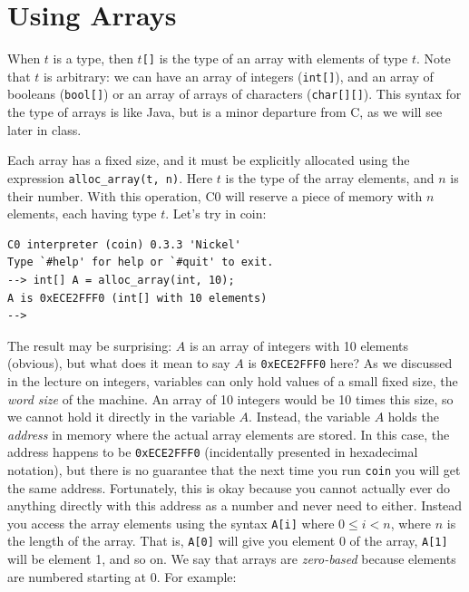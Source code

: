 \section{Using Arrays}
\label{sec:arrays:using}

When $t$ is a type, then $t$\lstinline'[]' is the type of an array
with elements of type $t$.  Note that $t$ is arbitrary: we can have an
array of integers (\lstinline'int[]'), and an array of booleans
(\lstinline'bool[]') or an array of arrays of characters
(\lstinline'char[][]').  This syntax for the type of arrays is like
Java, but is a minor departure from C, as we will see later in class.

Each array has a fixed size, and it must be explicitly allocated using
the expression \lstinline'alloc_array(t, n)'.  Here $t$ is the type of
the array elements, and $n$ is their number.  With this operation, C0
will reserve a piece of memory with $n$ elements, each having type
$t$.  Let's try in coin:

\begin{lstlisting}[language={[coin]C}]
% coin
C0 interpreter (coin) 0.3.3 'Nickel'
Type `#help' for help or `#quit' to exit.
--> int[] A = alloc_array(int, 10);
A is 0xECE2FFF0 (int[] with 10 elements)
-->
\end{lstlisting}

The result may be surprising: $A$ is an array of integers with 10
elements (obvious), but what does it mean to say $A$ is
\lstinline'0xECE2FFF0' here?  As we discussed in the lecture on
integers, variables can only hold values of a small fixed size, the
\emph{word size} of the machine.  An array of 10 integers would be 10
times this size, so we cannot hold it directly in the variable $A$.
Instead, the variable $A$ holds the \emph{address} in memory where the
actual array elements are stored.  In this case, the address happens
to be \lstinline'0xECE2FFF0' (incidentally presented in hexadecimal
notation), but there is no guarantee that the next time you run
\lstinline'coin' you will get the same address.  Fortunately, this is
okay because you cannot actually ever do anything directly with this
address as a number and never need to either.  Instead you access the
array elements using the syntax \lstinline'A[i]' where $0\leq i < n$,
where $n$ is the length of the array.  That is, \lstinline'A[0]' will
give you element 0 of the array, \lstinline'A[1]' will be element 1,
and so on.  We say that arrays are \emph{zero-based} because elements
are numbered starting at 0.  For example:

